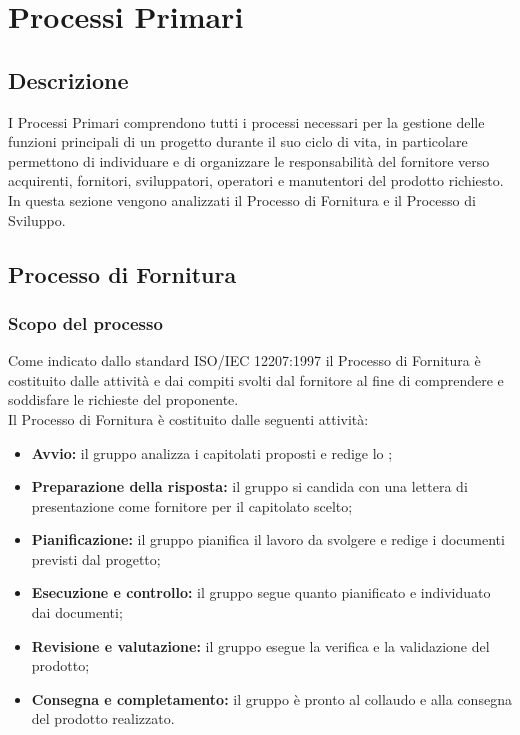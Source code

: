 \section{Processi Primari}
\subsection{Descrizione}
I Processi Primari comprendono tutti i processi necessari per la gestione delle funzioni principali di un progetto durante il suo ciclo di vita, in particolare permettono di individuare e di organizzare le responsabilità del fornitore verso acquirenti, fornitori, sviluppatori, operatori e manutentori del prodotto richiesto. \\
In questa sezione vengono analizzati il Processo di Fornitura e il Processo di Sviluppo.

\subsection{Processo di Fornitura}
\subsubsection{Scopo del processo}
Come indicato dallo standard ISO/IEC 12207:1997 il Processo di Fornitura è costituito dalle attività e dai compiti svolti dal fornitore al fine di comprendere e soddisfare le richieste del proponente. \\
Il Processo di Fornitura è costituito dalle seguenti attività:
\begin{itemize}
	\item \textbf{Avvio:} il gruppo analizza i capitolati proposti e redige lo \SdFv;
	\item \textbf{Preparazione della risposta:} il gruppo si candida con una lettera di presentazione come fornitore per il capitolato scelto;
	\item \textbf{Pianificazione:} il gruppo pianifica il lavoro da svolgere e redige i documenti previsti dal progetto;
	\item \textbf{Esecuzione e controllo:} il gruppo segue quanto pianificato e individuato dai documenti;
	\item \textbf{Revisione e valutazione:} il gruppo esegue la verifica e la validazione del prodotto;
	\item \textbf{Consegna e completamento:} il gruppo è pronto al collaudo e alla consegna del prodotto realizzato.
\end{itemize}

